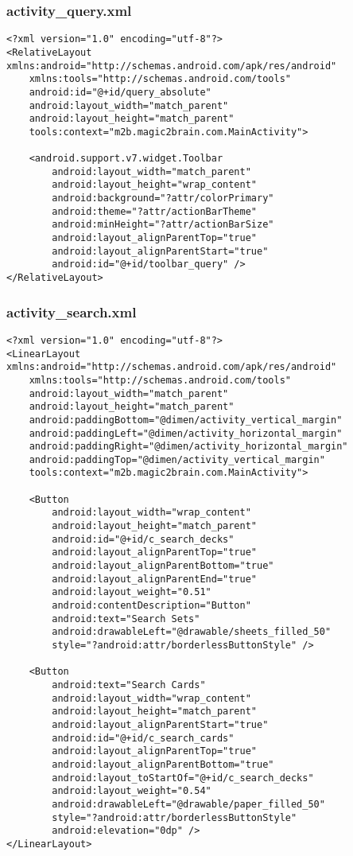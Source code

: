 \subsubsection{activity\_query.xml}
\begin{lstlisting}
<?xml version="1.0" encoding="utf-8"?>
<RelativeLayout xmlns:android="http://schemas.android.com/apk/res/android"
    xmlns:tools="http://schemas.android.com/tools"
    android:id="@+id/query_absolute"
    android:layout_width="match_parent"
    android:layout_height="match_parent"
    tools:context="m2b.magic2brain.com.MainActivity">

    <android.support.v7.widget.Toolbar
        android:layout_width="match_parent"
        android:layout_height="wrap_content"
        android:background="?attr/colorPrimary"
        android:theme="?attr/actionBarTheme"
        android:minHeight="?attr/actionBarSize"
        android:layout_alignParentTop="true"
        android:layout_alignParentStart="true"
        android:id="@+id/toolbar_query" />
</RelativeLayout>
\end{lstlisting}

\subsubsection{activity\_search.xml}
\begin{lstlisting}
<?xml version="1.0" encoding="utf-8"?>
<LinearLayout xmlns:android="http://schemas.android.com/apk/res/android"
    xmlns:tools="http://schemas.android.com/tools"
    android:layout_width="match_parent"
    android:layout_height="match_parent"
    android:paddingBottom="@dimen/activity_vertical_margin"
    android:paddingLeft="@dimen/activity_horizontal_margin"
    android:paddingRight="@dimen/activity_horizontal_margin"
    android:paddingTop="@dimen/activity_vertical_margin"
    tools:context="m2b.magic2brain.com.MainActivity">

    <Button
        android:layout_width="wrap_content"
        android:layout_height="match_parent"
        android:id="@+id/c_search_decks"
        android:layout_alignParentTop="true"
        android:layout_alignParentBottom="true"
        android:layout_alignParentEnd="true"
        android:layout_weight="0.51"
        android:contentDescription="Button"
        android:text="Search Sets"
        android:drawableLeft="@drawable/sheets_filled_50"
        style="?android:attr/borderlessButtonStyle" />

    <Button
        android:text="Search Cards"
        android:layout_width="wrap_content"
        android:layout_height="match_parent"
        android:layout_alignParentStart="true"
        android:id="@+id/c_search_cards"
        android:layout_alignParentTop="true"
        android:layout_alignParentBottom="true"
        android:layout_toStartOf="@+id/c_search_decks"
        android:layout_weight="0.54"
        android:drawableLeft="@drawable/paper_filled_50"
        style="?android:attr/borderlessButtonStyle"
        android:elevation="0dp" />
</LinearLayout>
\end{lstlisting}

